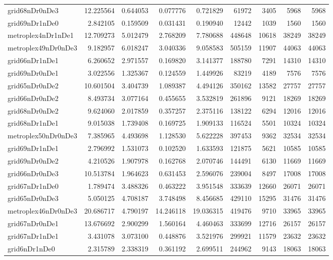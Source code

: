 \begin{longtable}{|l|r|r|r|r|r|r|r|r|}
grid68nDr0nDe3 & 12.225564 & 0.644053 & 0.077776 & 0.721829 & 61972 & 3405 & 5968 & 5968 \\
grid69nDr1nDe0 & 2.842105 & 0.159509 & 0.031431 & 0.190940 & 12442 & 1039 & 1560 & 1560 \\
metroplex4nDr1nDe1 & 12.709273 & 5.012479 & 2.768209 & 7.780688 & 448648 & 10618 & 38249 & 38249 \\
metroplex49nDr0nDe3 & 9.182957 & 6.018247 & 3.040336 & 9.058583 & 505159 & 11907 & 44063 & 44063 \\
grid66nDr1nDe1 & 6.260652 & 2.971557 & 0.169820 & 3.141377 & 188780 & 7291 & 14310 & 14310 \\
grid69nDr0nDe1 & 3.022556 & 1.325367 & 0.124559 & 1.449926 & 83219 & 4189 & 7576 & 7576 \\
grid65nDr0nDe2 & 10.601504 & 3.404739 & 1.089387 & 4.494126 & 350162 & 13582 & 27757 & 27757 \\
grid66nDr0nDe2 & 8.493734 & 3.077164 & 0.455655 & 3.532819 & 261896 & 9121 & 18269 & 18269 \\
grid68nDr0nDe2 & 9.624060 & 2.017859 & 0.357257 & 2.375116 & 138122 & 6294 & 12016 & 12016 \\
grid68nDr1nDe1 & 9.015038 & 1.739408 & 0.169725 & 1.909133 & 116524 & 5501 & 10324 & 10324 \\
metroplex50nDr0nDe3 & 7.385965 & 4.493698 & 1.128530 & 5.622228 & 397453 & 9362 & 32534 & 32534 \\
grid69nDr1nDe1 & 2.796992 & 1.531073 & 0.102520 & 1.633593 & 121875 & 5621 & 10585 & 10585 \\
grid69nDr0nDe2 & 4.210526 & 1.907978 & 0.162768 & 2.070746 & 144491 & 6130 & 11669 & 11669 \\
grid66nDr0nDe3 & 10.513784 & 1.964623 & 0.631453 & 2.596076 & 239004 & 8497 & 17008 & 17008 \\
grid67nDr1nDe0 & 1.789474 & 3.488326 & 0.463222 & 3.951548 & 333639 & 12660 & 26071 & 26071 \\
grid65nDr0nDe3 & 5.050125 & 4.708187 & 3.748498 & 8.456685 & 429110 & 15295 & 31476 & 31476 \\
metroplex46nDr0nDe3 & 20.686717 & 4.790197 & 14.246118 & 19.036315 & 419476 & 9710 & 33965 & 33965 \\
grid67nDr0nDe1 & 13.676692 & 2.900299 & 1.560164 & 4.460463 & 333699 & 12716 & 26157 & 26157 \\
grid67nDr1nDe1 & 3.431078 & 3.073100 & 0.448876 & 3.521976 & 299921 & 11579 & 23632 & 23632 \\
grid6nDr1nDe0 & 2.315789 & 2.338319 & 0.361192 & 2.699511 & 244962 & 9143 & 18063 & 18063 \\

\end{longtable}
